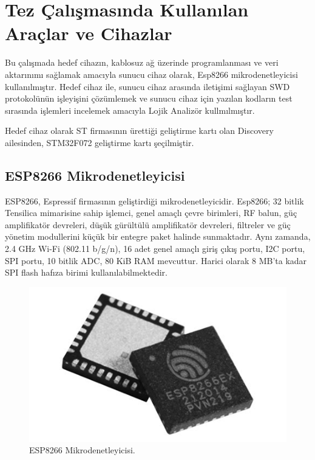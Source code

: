 \chapter{Tez Çalışmasında Kullanılan Araçlar ve Cihazlar}

Bu çalışmada hedef cihazın, kablosuz ağ üzerinde programlanması ve veri aktarınımı sağlamak amacıyla sunucu cihaz olarak, Esp8266 mikrodenetleyicisi kullanılmıştır.
Hedef cihaz ile, sunucu cihaz arasında iletişimi sağlayan \acrfull{SWD} protokolünün işleyişini çözümlemek ve sunucu cihaz için yazılan kodların test sırasında işlemleri
incelemek amacıyla Lojik Analizör kullmılmıştır.

Hedef cihaz olarak ST firmasının ürettiği geliştirme kartı olan Discovery ailesinden, STM32F072 geliştirme kartı şeçilmiştir.

\section{ESP8266 Mikrodenetleyicisi}

ESP8266, Espressif firmasının geliştirdiği  mikrodenetleyicidir. Esp8266; 32 bitlik Tensilica mimarisine sahip işlemci, genel amaçlı çevre birimleri,
RF balun, güç amplifikatör devreleri, düşük gürültülü amplifikatör devreleri, filtreler ve güç yönetim modullerini küçük bir entegre paket halinde sunmaktadır. Aynı zamanda, 2.4 GHz Wi-Fi (802.11 b/g/n),
16 adet genel amaçlı giriş çıkış portu, \acrfull{I2C} portu, \acrfull{SPI} portu, 10 bitlik \acrfull{ADC}, 80 KiB  RAM mevcuttur. Harici olarak 8 MB'ta kadar SPI flash hafıza birimi
kullanılabilmektedir.


\begin{figure}[h]
\centering
\includegraphics[width=\textwidth]{gorseller/esp8266ex}
\caption{ESP8266 Mikrodenetleyicisi.}\label{fig:esp8266ex}
\end{figure}

